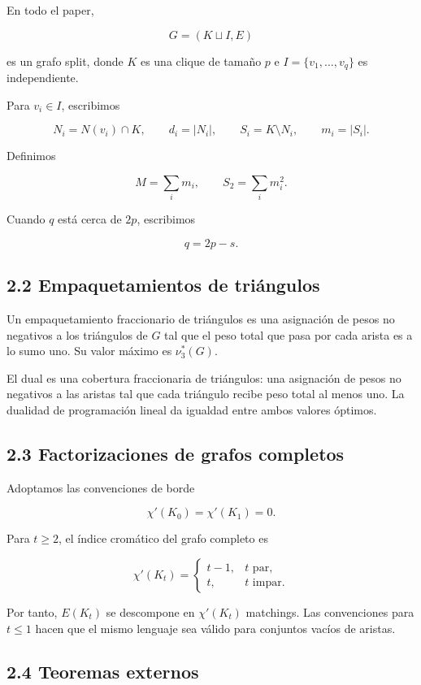 \documentclass[
  11pt,
]{article}
\begin{document}
En todo el paper,

\[
G=(K\sqcup I,E)
\]

es un grafo split, donde \(K\) es una clique de tamaño \(p\) e
\(I=\{v_1,\ldots,v_q\}\) es independiente.

Para \(v_i\in I\), escribimos

\[
N_i=N(v_i)\cap K,
\qquad
d_i=|N_i|,
\qquad
S_i=K\setminus N_i,
\qquad
m_i=|S_i|.
\]

Definimos

\[
M=\sum_i m_i,
\qquad
S_2=\sum_i m_i^2.
\]

Cuando \(q\) está cerca de \(2p\), escribimos

\[
q=2p-s.
\tag{2.1}
\]

\subsection{2.2 Empaquetamientos de
triángulos}\label{empaquetamientos-de-triuxe1ngulos}

Un empaquetamiento fraccionario de triángulos es una asignación de pesos
no negativos a los triángulos de \(G\) tal que el peso total que pasa
por cada arista es a lo sumo uno. Su valor máximo es \(\nu_3^*(G)\).

El dual es una cobertura fraccionaria de triángulos: una asignación de
pesos no negativos a las aristas tal que cada triángulo recibe peso
total al menos uno. La dualidad de programación lineal da igualdad entre
ambos valores óptimos.

\subsection{2.3 Factorizaciones de grafos
completos}\label{factorizaciones-de-grafos-completos}

Adoptamos las convenciones de borde

\[
\chi'(K_0)=\chi'(K_1)=0.
\]

Para \(t\ge2\), el índice cromático del grafo completo es

\[
\chi'(K_t)
=
\begin{cases}
t-1,&t\text{ par},\\
t,&t\text{ impar}.
\end{cases}
\tag{2.2}
\]

Por tanto, \(E(K_t)\) se descompone en \(\chi'(K_t)\) matchings. Las
convenciones para \(t\le1\) hacen que el mismo lenguaje sea válido para
conjuntos vacíos de aristas.

\subsection{2.4 Teoremas externos}\label{teoremas-externos}
\end{document}
